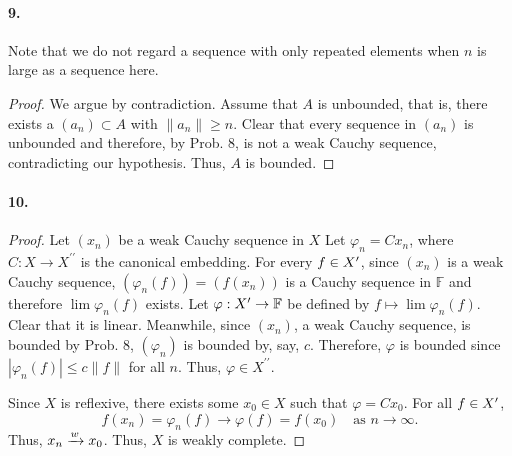   \paragraph{9.}
    Note that we do not regard a sequence with only repeated elements when $n$
    is large as a sequence here.
  \begin{proof}
    We argue by contradiction. Assume that $A$ is unbounded, that is, there 
    exists a $(a_n)\subset A$ with $\|a_n\|\ge n$. Clear that every sequence in
     $(a_n)$ is unbounded and therefore, by Prob. 8, is not a weak Cauchy 
     sequence, contradicting our hypothesis. Thus, $A$ is bounded.
  \end{proof}
  
  \paragraph{10.}
  \begin{proof}
    Let $(x_n)$ be a weak Cauchy sequence in $X$ Let $\varphi_n=Cx_n$, where $C:
    X\to X^{\prime\prime}$ is the canonical embedding. For every $f\in X^\prime$,
    since $(x_n)$ is a weak Cauchy sequence, $(\varphi_n(f))=(f(x_n))$ is a 
    Cauchy sequence in $\mathbb{F}$ and therefore $\lim\varphi_n(f)$ exists. Let
    $\varphi:X^\prime\to\mathbb{F}$ be defined by $f\mapsto \lim\varphi_n(f)$. Clear
    that it is linear. Meanwhile, since $(x_n)$, a weak Cauchy sequence, is
    bounded by Prob. 8, $(\varphi_n)$ is bounded by, say, $c$. Therefore, 
    $\varphi$ is bounded since $|\varphi_n(f)|\le c\|f\|$ for all $n$. Thus, 
    $\varphi\in X^{\prime\prime}$. \par
    Since $X$ is reflexive, there exists some $x_0\in X$ such that $\varphi=
    Cx_0$. For all $f\in X^\prime$,
    \[
      f(x_n)=\varphi_n(f) \to \varphi(f) = f(x_0)\quad\text{as $n\to\infty$}.
    \]
    Thus, $x_n\xrightarrow{w} x_0$. Thus, $X$ is weakly complete.
  \end{proof}




















